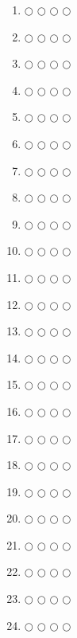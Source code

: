 \documentclass[a4paper,12pt]{article}
\begin{document}
\begin{multicols}{4}
\begin{enumerate}
  \item $\bigcirc$ $\bigcirc$ $\bigcirc$ $\bigcirc$
  \item $\bigcirc$ $\bigcirc$ $\bigcirc$ $\bigcirc$
  \item $\bigcirc$ $\bigcirc$ $\bigcirc$ $\bigcirc$
  \item $\bigcirc$ $\bigcirc$ $\bigcirc$ $\bigcirc$
  \item $\bigcirc$ $\bigcirc$ $\bigcirc$ $\bigcirc$
  \item $\bigcirc$ $\bigcirc$ $\bigcirc$ $\bigcirc$
  \item $\bigcirc$ $\bigcirc$ $\bigcirc$ $\bigcirc$
  \item $\bigcirc$ $\bigcirc$ $\bigcirc$ $\bigcirc$
  \item $\bigcirc$ $\bigcirc$ $\bigcirc$ $\bigcirc$
  \item $\bigcirc$ $\bigcirc$ $\bigcirc$ $\bigcirc$
  \item $\bigcirc$ $\bigcirc$ $\bigcirc$ $\bigcirc$
  \item $\bigcirc$ $\bigcirc$ $\bigcirc$ $\bigcirc$
  \item $\bigcirc$ $\bigcirc$ $\bigcirc$ $\bigcirc$
  \item $\bigcirc$ $\bigcirc$ $\bigcirc$ $\bigcirc$
  \item $\bigcirc$ $\bigcirc$ $\bigcirc$ $\bigcirc$
  \item $\bigcirc$ $\bigcirc$ $\bigcirc$ $\bigcirc$
  \item $\bigcirc$ $\bigcirc$ $\bigcirc$ $\bigcirc$
  \item $\bigcirc$ $\bigcirc$ $\bigcirc$ $\bigcirc$
  \item $\bigcirc$ $\bigcirc$ $\bigcirc$ $\bigcirc$
  \item $\bigcirc$ $\bigcirc$ $\bigcirc$ $\bigcirc$
  \item $\bigcirc$ $\bigcirc$ $\bigcirc$ $\bigcirc$
  \item $\bigcirc$ $\bigcirc$ $\bigcirc$ $\bigcirc$
  \item $\bigcirc$ $\bigcirc$ $\bigcirc$ $\bigcirc$
  \item $\bigcirc$ $\bigcirc$ $\bigcirc$ $\bigcirc$

\end{enumerate}
\end{multicols}
\end{document}
